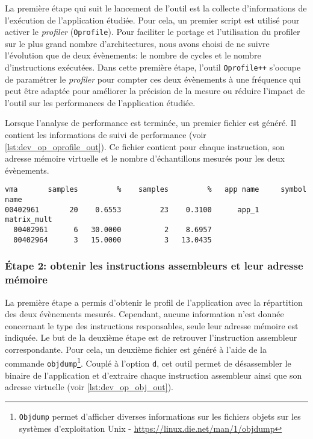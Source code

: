         La première étape qui suit le lancement de l'outil est la collecte d'informations de l'exécution de l'application étudiée. Pour cela, un premier script est utilisé pour activer le \textit{profiler} (\verb=Oprofile=). Pour faciliter le portage et l'utilisation du profiler sur le plus grand nombre d'architectures, nous avons choisi de ne suivre l'évolution que de deux évènements: le nombre de cycles et le nombre d'instructions exécutées. Dans cette première étape, l'outil \verb=Oprofile++= s'occupe de paramétrer le \textit{profiler} pour compter ces deux évènements à une fréquence qui peut être adaptée pour améliorer la précision de la mesure ou réduire l'impact de l'outil sur les performances de l'application étudiée. 

        Lorsque l'analyse de performance est terminée, un premier fichier est généré. Il contient les informations de suivi de performance (voir \autoref{lst:dev_op_oprofile_out}). Ce fichier contient pour chaque instruction, son adresse mémoire virtuelle et le nombre d'échantillons mesurés pour les deux évènements. 
        
\begin{lstlisting}[label=lst:dev_op_oprofile_out, caption={\texttt{Oprofile++} exécute l'application et génère un premier fichier contenant l'adresse virtuelle des instructions (\textit{vma}) et le nombre d'évènements correspondant (nombre de cycle, nombre d'instructions). }]
vma       samples         %    samples         %   app name     symbol name
00402961       20    0.6553         23    0.3100      app_1     matrix_mult
  00402961      6   30.0000          2    8.6957
  00402964      3   15.0000          3   13.0435
\end{lstlisting}   
  
  
        
    \subsubsection{Étape 2: obtenir les instructions assembleurs et leur adresse mémoire}

    La première étape a permis d'obtenir le profil de l'application avec la répartition des deux évènements mesurés. Cependant, aucune information n'est donnée concernant le type des instructions responsables, seule leur adresse mémoire est indiquée. Le but de la deuxième étape est de retrouver l'instruction assembleur correspondante. Pour cela, un deuxième fichier est généré à l'aide de la commande \verb=objdump=\footnote{\texttt{Objdump} permet d'afficher diverses informations sur les fichiers objets sur les systèmes d'exploitation Unix - \url{https://linux.die.net/man/1/objdump}}. Couplé à l'option \verb=d=, cet outil permet de désassembler le binaire de l'application et d'extraire chaque instruction assembleur ainsi que son adresse virtuelle (voir \autoref{lst:dev_op_obj_out}).

